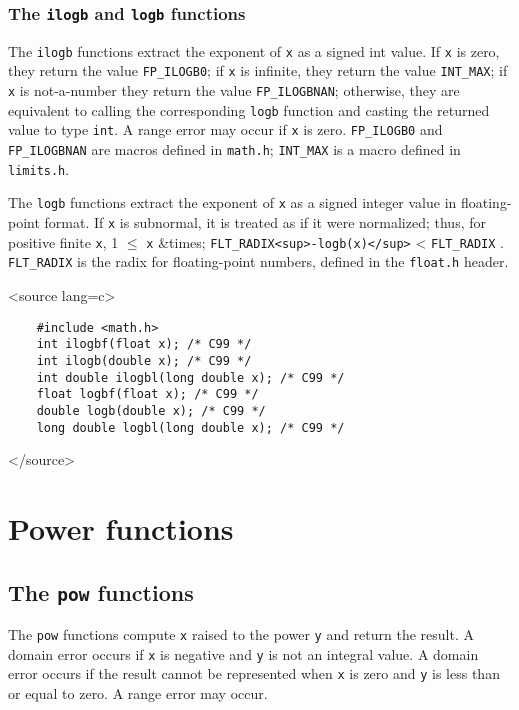 \subsubsection{The \texttt{ilogb} and \texttt{logb} functions}

The \texttt{ilogb} functions extract the exponent of \texttt{x} as a signed int
value. If \texttt{x} is zero, they return the value \texttt{FP\_ILOGB0}; if
\texttt{x} is infinite, they return the value \texttt{INT\_MAX}; if \texttt{x}
is not-a-number they return the value \texttt{FP\_ILOGBNAN}; otherwise, they
are equivalent to calling the corresponding \texttt{logb} function and casting
the returned value to type \texttt{int}. A range error may occur if \texttt{x}
is zero. \texttt{FP\_ILOGB0} and \texttt{FP\_ILOGBNAN} are macros defined in
\texttt{math.h}; \texttt{INT\_MAX} is a macro defined in \texttt{limits.h}.

The \texttt{logb} functions extract the exponent of \texttt{x} as a signed integer value in floating-point format. If \texttt{x} is subnormal, it is treated as if it were normalized; thus, for positive finite \texttt{x}, 1 $ \leq $ \texttt{x} \&times; \texttt{FLT\_RADIX\textless{}sup\textgreater{}-logb(x)\textless{}/sup\textgreater{}} \textless{} \texttt{FLT\_RADIX} . \texttt{FLT\_RADIX} is the radix for floating-point numbers, defined in the \texttt{float.h} header.

\textless{}source lang=c\textgreater{}
\begin{verbatim}
	#include <math.h>
	int ilogbf(float x); /* C99 */
	int ilogb(double x); /* C99 */
	int double ilogbl(long double x); /* C99 */
	float logbf(float x); /* C99 */
	double logb(double x); /* C99 */
	long double logbl(long double x); /* C99 */
\end{verbatim}
\textless{}/source\textgreater{}

\section{Power functions}

\subsection{The \texttt{pow} functions}

The \texttt{pow} functions compute \texttt{x} raised to the power \texttt{y} and return the result. A domain error occurs if \texttt{x} is negative and \texttt{y} is not an integral value. A domain error occurs if the result cannot be represented when \texttt{x} is zero and \texttt{y} is less than or equal to zero. A range error may occur.

